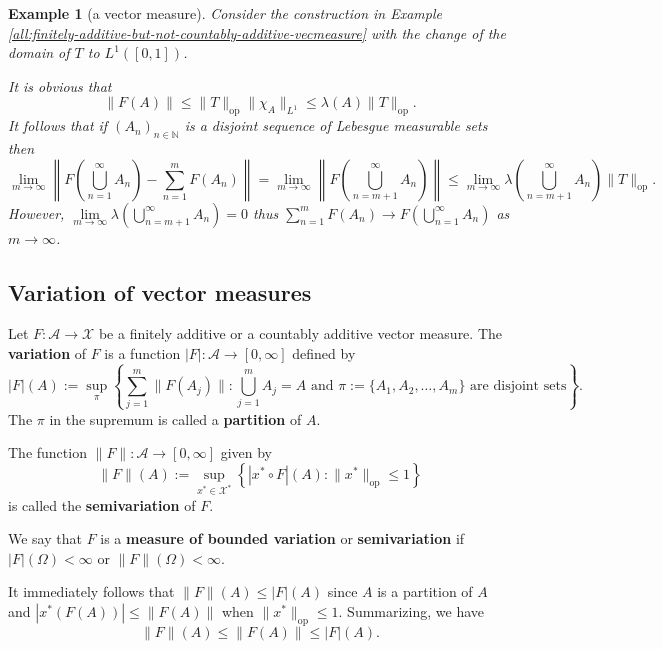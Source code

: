 \documentclass[a4paper, 12pt]{article}
\newtheorem{example}[lem]{Example}
\begin{document}
\begin{example}[a vector measure]\label{ex:vector-measure2}\normalfont Consider the construction in Example \ref{all:finitely-additive-but-not-countably-additive-vecmeasure} with the change of the domain of $T$ to $L^1([0,1])$.

It is obvious that
$$\| F(A) \| \leqslant \|T\|_{\mathrm{op}}\| \chi_{A} \|_{L^1} \leqslant \lambda(A) \|T\|_{\mathrm{op}}.$$
It follows that if $(A_n)_{n \in \mathbb{N}}$ is a disjoint sequence of Lebesgue measurable sets then
$$\lim_{m \to \infty} \left \| F \left(\bigcup^{\infty}_{n=1}A_n \right) - \sum^{m}_{n=1}F(A_n) \right \| = \lim_{m \to \infty} \left \| F \left(\bigcup^{\infty}_{n=m+1}A_n \right)\right \| \leqslant \lim_{m \to \infty} \lambda\left(\bigcup^{\infty}_{n=m+1}A_n \right) \| T \|_{\mathrm{op}}.$$
However, $\lim\limits_{m \to \infty} \lambda\left(\bigcup^{\infty}_{n=m+1}A_n \right) = 0$ thus $\sum^{m}_{n=1}F(A_n) \to F \left(\bigcup^{\infty}_{n=1}A_n \right)$ as $m \to \infty$.
\end{example}
\subsection{Variation of vector measures}
Let $F \colon \mathcal{A} \to \mathcal{X}$ be a finitely additive or a countably additive vector measure. The \textbf{variation} of $F$ is a function $|F| \colon \mathcal{A} \to [0, \infty]$ defined by
$$|F|(A) := \sup_{\pi} \left\lbrace \sum^{m}_{j=1} \| F(A_j) \| : \bigcup^{m}_{j=1} A_j = A \text{ and } \pi := \lbrace A_1, A_2, \ldots, A_m \rbrace \text{ are disjoint sets} \right\rbrace.$$
The $\pi$ in the supremum is called a \textbf{partition} of $A$.

The function $\|F\| \colon \mathcal{A} \to [0, \infty]$ given by
$$\|F\|(A) := \sup_{x^* \in \mathcal{X}^*} \left \lbrace |x^* \circ F|(A) : \| x^* \|_{\mathrm{op}} \leqslant 1 \right \rbrace$$
is called the \textbf{semivariation} of $F$.

We say that $F$ is a \textbf{measure of bounded variation} or \textbf{semivariation} if $|F|(\Omega) < \infty$ or $\|F\|(\Omega) < \infty$.


It immediately follows that $\|F\|(A) \leqslant |F|(A)$ since $A$ is a partition of $A$ and $|x^*(F(A))| \leqslant \| F(A) \|$ when $\| x^* \|_{\mathrm{op}} \leqslant 1.$ Summarizing, we have 
\begin{equation}\label{ineq:vector-measures-ineq}
\|F\|(A) \leqslant \| F(A) \| \leqslant |F|(A).
\end{equation}
\end{document}
